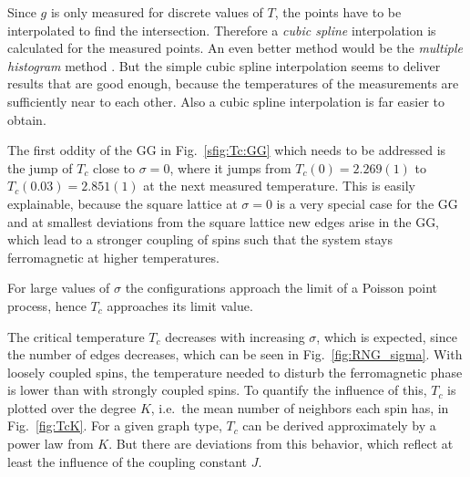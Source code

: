 Since \(g\) is only measured for discrete values of \(T\),
the points have to be interpolated to find the intersection. Therefore
a \emph{cubic spline} \cite{press2007numerical} interpolation %
is calculated for the measured points.
An even better method would be the
\emph{multiple histogram} method \cite[p. 219ff]{NewmanBarkema1999}.
But the simple cubic spline interpolation seems to deliver results that
are good enough, because the temperatures of the measurements are
sufficiently near to each other. Also a cubic spline interpolation is
far easier to obtain.

The first oddity of the GG in Fig.~\ref{sfig:Tc:GG} which needs to be addressed is
the jump of $T_c$ close to $\sigma = 0$, where it jumps from $T_c(0) = 2.269(1)$
to $T_c(0.03) = 2.851(1)$ at the next measured temperature. This is easily explainable,
because the square lattice at $\sigma = 0$ is a very special case for the
GG and at smallest deviations from the square lattice new edges arise in
the GG, which lead to a stronger coupling of spins such that the system stays
ferromagnetic at higher temperatures.

For large values of $\sigma$ the configurations approach the limit of a
Poisson point process, hence $T_c$ approaches its limit value.

The critical temperature $T_c$ decreases with increasing $\sigma$, which
is expected, since the number of edges decreases, which can be seen in
Fig.~\ref{fig:RNG_sigma}. With loosely coupled spins, the temperature
needed to disturb the ferromagnetic phase is lower than with strongly coupled
spins. To quantify the influence of this, $T_c$ is plotted over the
degree $K$, i.e.~the mean number of neighbors each spin has, in Fig.~\ref{fig:TcK}.
For a given graph type, $T_c$ can be derived approximately by a power law
from $K$. But there are deviations from this behavior, which reflect
at least the influence of the coupling constant $J$.
